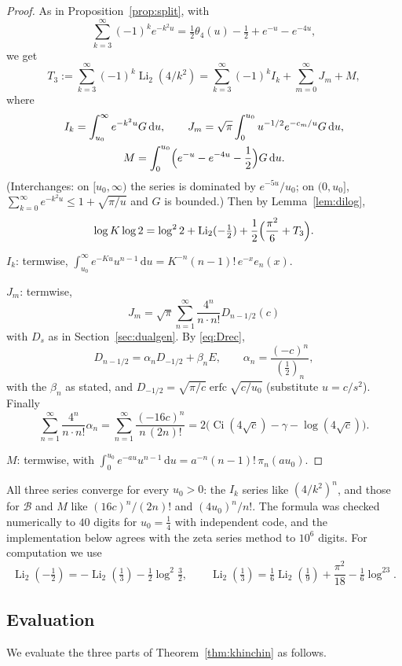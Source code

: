 \documentclass[11pt,reqno]{amsart}
\theoremstyle{definition}
\theoremstyle{remark}
\newcommand{\erfc}{\operatorname{erfc}}
\newcommand{\Ci}{\operatorname{Ci}}
\newcommand{\Li}{\operatorname{Li}}
\newcommand{\dd}{\,\mathrm{d}}
\begin{document}
\begin{proof}
As in Proposition~\ref{prop:split}, with
\[
  \sum_{k=3}^{\infty}(-1)^ke^{-k^2u} = \tfrac12\theta_4(u) - \tfrac12 + e^{-u} - e^{-4u},
\]
we get
\[
  T_3 := \sum_{k=3}^{\infty}(-1)^k\Li_2(4/k^2) = \sum_{k=3}^{\infty}(-1)^k I_k + \sum_{m=0}^{\infty} J_m + M,
\]
where
\begin{gather*}
  I_k = \int_{u_0}^\infty e^{-k^2u}G\dd u, \qquad J_m = \sqrt\pi\int_0^{u_0}u^{-1/2}e^{-c_m/u}G\dd u, \\
  M = \int_0^{u_0}\Bigl(e^{-u} - e^{-4u} - \frac12\Bigr)G\dd u.
\end{gather*}
(Interchanges: on $[u_0,\infty)$ the series is dominated by
$e^{-5u}/u_0$; on $(0,u_0]$, $\sum_{k=0}^{\infty} e^{-k^2u} \le 1 + \sqrt{\pi/u}$ and $G$ is bounded.) Then
by Lemma~\ref{lem:dilog},
\[
  \log K\log2 = \log^22 + \Li_2(-\tfrac12) + \frac12\Bigl(\frac{\pi^2}6 + T_3\Bigr).
\]

$I_k$: termwise, $\int_{u_0}^\infty e^{-Ku}u^{n-1}\dd u = K^{-n}(n-1)!\,e^{-x}e_n(x)$.

$J_m$: termwise,
\[
  J_m = \sqrt\pi\sum_{n=1}^{\infty} \frac{4^n}{n\cdot n!}D_{n-1/2}(c)
\]
with $D_s$ as in Section~\ref{sec:dualgen}. By \eqref{eq:Drec},
\[
  D_{n-1/2} = \alpha_n D_{-1/2} + \beta_n E, \qquad \alpha_n = \frac{(-c)^n}{(\frac12)_n},
\]
with the $\beta_n$ as stated, and $D_{-1/2} = \sqrt{\pi/c}\erfc\sqrt{c/u_0}$ (substitute $u = c/s^2$). Finally
\[
  \sum_{n=1}^{\infty} \frac{4^n}{n\cdot n!}\alpha_n = \sum_{n=1}^{\infty}\frac{(-16c)^n}{n\,(2n)!} = 2\bigl(\Ci(4\sqrt c) - \gamma - \log(4\sqrt c)\bigr).
\]

$M$: termwise, with $\int_0^{u_0}e^{-au}u^{n-1}\dd u = a^{-n}(n-1)!\,\pi_n(au_0)$.
\end{proof}

All three series converge for every $u_0 > 0$: the $I_k$ series like $(4/k^2)^n$, and those for
$\mathcal B$ and $M$ like $(16c)^n/(2n)!$ and $(4u_0)^n/n!$. The formula was checked numerically to
$40$ digits for $u_0 = \frac14$ with independent code, and the implementation below agrees with the zeta
series method to $10^6$ digits. For computation we use
\[
  \Li_2(-\tfrac12) = -\Li_2(\tfrac13) - \tfrac12\log^2\tfrac32, \qquad
  \Li_2(\tfrac13) = \tfrac16\Li_2(\tfrac19) + \frac{\pi^2}{18} - \tfrac16\log^23.
\]

\subsection{Evaluation}\label{sec:kheval}
We evaluate the three parts of Theorem~\ref{thm:khinchin} as follows.
\end{document}
